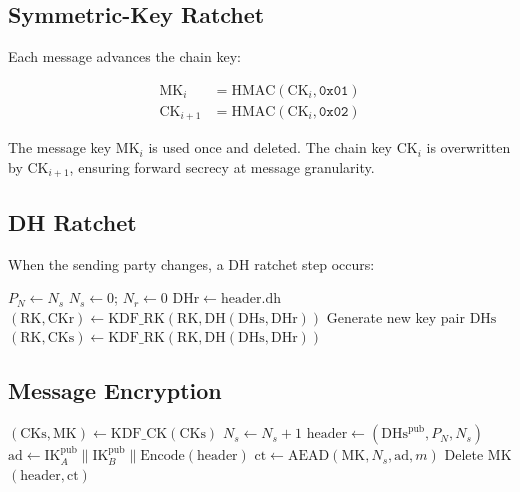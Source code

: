 \documentclass[11pt,a4paper]{article}
\begin{document}
\subsection{Symmetric-Key Ratchet}

Each message advances the chain key:

\begin{align}
    \mathrm{MK}_i &= \mathrm{HMAC}(\mathrm{CK}_i, \texttt{0x01}) \\
    \mathrm{CK}_{i+1} &= \mathrm{HMAC}(\mathrm{CK}_i, \texttt{0x02})
\end{align}

The message key $\mathrm{MK}_i$ is used once and deleted.  The chain key
$\mathrm{CK}_i$ is overwritten by $\mathrm{CK}_{i+1}$, ensuring forward
secrecy at message granularity.

\subsection{DH Ratchet}

When the sending party changes, a DH ratchet step occurs:

\begin{algorithm}[H]
\caption{DH Ratchet Step}
\label{alg:dh-ratchet}
\begin{algorithmic}[1]
    \State $P_N \gets N_s$
    \State $N_s \gets 0$;\; $N_r \gets 0$
    \State $\mathrm{DHr} \gets \mathrm{header.dh}$
    \State $(\mathrm{RK}, \mathrm{CKr}) \gets
        \mathrm{KDF\_RK}(\mathrm{RK},
        \mathrm{DH}(\mathrm{DHs}, \mathrm{DHr}))$
    \State Generate new key pair $\mathrm{DHs}$
    \State $(\mathrm{RK}, \mathrm{CKs}) \gets
        \mathrm{KDF\_RK}(\mathrm{RK},
        \mathrm{DH}(\mathrm{DHs}, \mathrm{DHr}))$
\EndProcedure
\end{algorithmic}
\end{algorithm}

\subsection{Message Encryption}

\begin{algorithm}[H]
\caption{Encrypt Message}
\label{alg:encrypt}
\begin{algorithmic}[1]
    \State $(\mathrm{CKs}, \mathrm{MK}) \gets
        \mathrm{KDF\_CK}(\mathrm{CKs})$
    \State $N_s \gets N_s + 1$
    \State $\mathrm{header} \gets (\mathrm{DHs}^{\mathrm{pub}}, P_N, N_s)$
    \State $\mathrm{ad} \gets \mathrm{IK}_A^{\mathrm{pub}} \|
        \mathrm{IK}_B^{\mathrm{pub}} \|
        \mathrm{Encode}(\mathrm{header})$
    \State $\mathrm{ct} \gets
        \mathrm{AEAD}(\mathrm{MK}, N_s, \mathrm{ad}, m)$
    \State Delete MK
    \State \Return $(\mathrm{header}, \mathrm{ct})$
\EndFunction
\end{algorithmic}
\end{algorithm}
\end{document}
